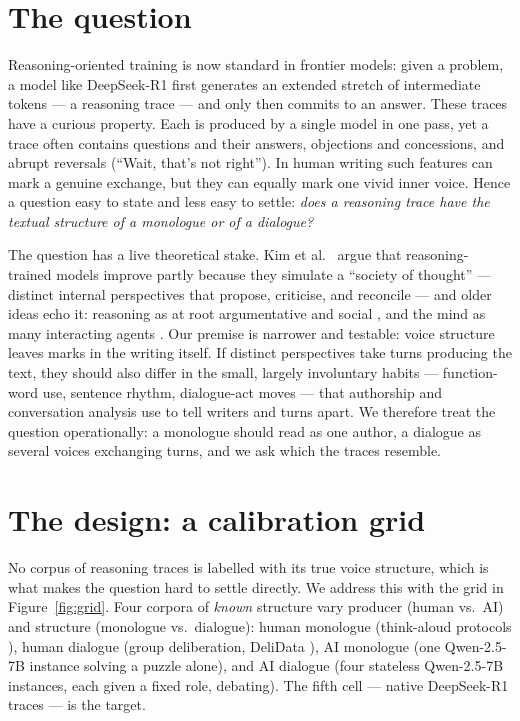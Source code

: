 \documentclass[10pt,twocolumn]{article}
\begin{document}
\section{The question}
Reasoning-oriented training is now standard in frontier models: given a problem, a model like
DeepSeek-R1 \cite{guo2025} first generates an extended stretch of intermediate tokens
\cite{kambhampati2025} --- a reasoning trace --- and only then commits to an answer. These traces
have a curious property. Each is produced by a single model in one pass, yet a trace often contains
questions and their answers, objections and concessions, and abrupt reversals
(``Wait, that's not right''). In human writing such features can mark a genuine exchange, but they
can equally mark one vivid inner voice. Hence a question easy to state and less easy to settle:
\emph{does a reasoning trace have the textual structure of a monologue or of a dialogue?}

The question has a live theoretical stake. Kim et al.~\cite{kim2026} argue that reasoning-trained
models improve partly because they simulate a ``society of thought'' --- distinct internal
perspectives that propose, criticise, and reconcile --- and older ideas echo it: reasoning as at
root argumentative and social \cite{mercier2017}, and the mind as many interacting agents
\cite{minsky1986}. Our premise is narrower and testable: voice structure leaves marks in the
writing itself. If distinct perspectives take turns producing the text, they should also differ in
the small, largely involuntary habits --- function-word use, sentence rhythm, dialogue-act moves
--- that authorship and conversation analysis use to tell writers and turns apart. We therefore
treat the question operationally: a monologue should read as one author, a dialogue as several
voices exchanging turns, and we ask which the traces resemble.

\section{The design: a calibration grid}
No corpus of reasoning traces is labelled with its true voice structure, which is what makes the
question hard to settle directly. We address this with the grid in Figure~\ref{fig:grid}. Four
corpora of \emph{known} structure vary producer (human vs.\ AI) and structure (monologue vs.\
dialogue): human monologue (think-aloud protocols \cite{wurgaft2025}), human dialogue (group
deliberation, DeliData \cite{karadzhov2023}), AI monologue (one Qwen-2.5-7B instance solving a
puzzle alone), and AI dialogue (four stateless Qwen-2.5-7B instances, each given a fixed role,
debating). The fifth cell --- native DeepSeek-R1 traces --- is the target.
\end{document}
